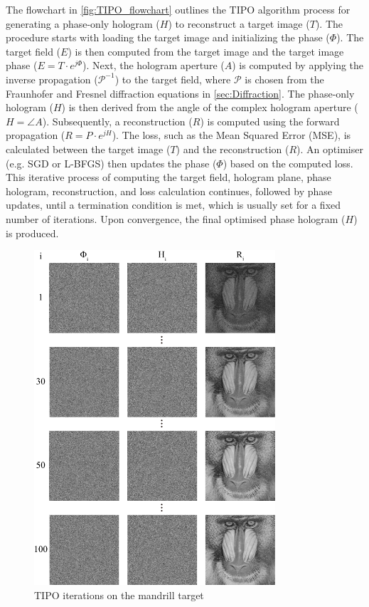 The flowchart in \cref{fig:TIPO_flowchart} outlines the TIPO algorithm process for generating a phase-only hologram ($H$) to reconstruct a target image ($T$). The procedure starts with loading the target image and initializing the phase ($\Phi$). The target field ($E$) is then computed from the target image and the target image phase ($E = T \cdot e^{j\Phi}$). Next, the hologram aperture ($A$) is computed by applying the inverse propagation ($\mathcal{P}^{-1}$) to the target field, where $\mathcal{P}$ is chosen from the Fraunhofer and Fresnel diffraction equations in \cref{sec:Diffraction}. The phase-only hologram ($H$) is then derived from the angle of the complex hologram aperture ($H = \angle A$). Subsequently, a reconstruction ($R$) is computed using the forward propagation ($R = P \cdot e^{jH}$). The loss, such as the Mean Squared Error (MSE), is calculated between the target image ($T$) and the reconstruction ($R$). An optimiser (e.g. SGD or L-BFGS) then updates the phase ($\Phi$) based on the computed loss. This iterative process of computing the target field, hologram plane, phase hologram, reconstruction, and loss calculation continues, followed by phase updates, until a termination condition is met, which is usually set for a fixed number of iterations. Upon convergence, the final optimised phase hologram ($H$) is produced.

\begin{figure}[H]
	\centering
	\includegraphics[width=0.8\textwidth]{TIPO_iters.pdf}
	\caption{TIPO iterations on the mandrill target}
	\label{fig:TIPO_iters}
\end{figure}

